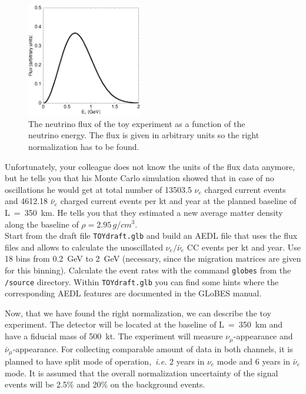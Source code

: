 \documentclass[12pt,a4paper]{article}
\newcommand{\aufg}[2]{\vspace{4mm}{\bf\underline{Problem #1:} {#2}} \vspace{3mm}}
\theoremstyle{dotless}
\begin{document}
\begin{figure}[h!]
  \begin{center}
    \includegraphics[width=0.45\textwidth]{FLUX.eps} 
  \end{center}
  \vspace{-0.7 cm}
  \caption{\small The neutrino flux of the toy experiment as a function of the neutrino energy.
  The flux is given in arbitrary units so the right normalization has to be found.}
  \label{fig:flux}
\end{figure}

Unfortunately, your colleague does not know the units of the flux data anymore, but he 
tells you that his Monte Carlo simulation showed that in case of no oscillations 
he would get at total number of 13503.5 $\nu_e$ charged current events and 
4612.18 $\bar{\nu}_e$ charged current events per kt and year at the planned baseline 
of L~=~350~km. He tells you that they estimated a new average matter density along the
baseline of $\rho=2.95\,g/cm^3$. \\

Start from the draft file {\tt TOYdraft.glb} and build an AEDL file that
uses the flux files and allows to calculate the unoscillated $\nu_e/\bar{\nu}_e$ CC events per kt and
year. Use 18 bins from 0.2~GeV to 2~GeV (necessary, since the migration matrices are given for this binning). 
Calculate the event rates with the
command {\tt globes} from the {\tt /source} directory. Within {\tt TOYdraft.glb}  
you can find some hints where the corresponding AEDL features are documented in the GLoBES
manual.

\aufg{3}{Describing the Experiment}

Now, that we have found the right normalization, we can describe the toy experiment. The detector will
be located at the baseline of L~=~350~km and have a fiducial mass of 500~kt. The experiment
will measure $\nu_\mu$-appearance and $\bar{\nu}_\mu$-appearance. For collecting comparable
amount of data in both channels, it is planned to have split mode of operation,~{\it i.e.}
2 years in $\nu_e$ mode and 6 years in $\bar{\nu}_e$ mode. It is assumed that the overall
normalization uncertainty of the signal events will be 2.5\% and 20\% on the background events. \\
\end{document}
